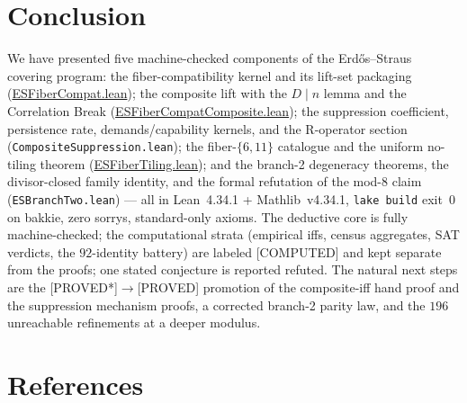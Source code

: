 \documentclass[11pt,a4paper]{article}
\theoremstyle{definition}
\begin{document}
\section{Conclusion}

We have presented five machine-checked components of the Erd\H{o}s--Straus
covering program: the fiber-compatibility kernel and its lift-set
packaging (\url{ESFiberCompat.lean}); the composite lift with the
$D\mid n$ lemma and the Correlation Break
(\url{ESFiberCompatComposite.lean}); the suppression coefficient,
persistence rate, demands/capability kernels, and the R-operator section
(\texttt{CompositeSuppression.lean}); the fiber-$\{6,11\}$ catalogue and
the uniform no-tiling theorem (\url{ESFiberTiling.lean}); and the
branch-2 degeneracy theorems, the divisor-closed family identity, and
the formal refutation of the mod-$8$ claim (\texttt{ESBranchTwo.lean}) ---
all in Lean~4.34.1 + Mathlib~v4.34.1, \texttt{lake build} exit~$0$ on
bakkie, zero sorrys, standard-only axioms. The deductive core is fully
machine-checked; the computational strata (empirical iffs, census
aggregates, SAT verdicts, the $92$-identity battery) are labeled
[COMPUTED] and kept separate from the proofs; one stated conjecture is
reported refuted. The natural next steps are the [PROVED*]$\to$[PROVED]
promotion of the composite-iff hand proof and the suppression mechanism
proofs, a corrected branch-2 parity law, and the $196$ unreachable
refinements at a deeper modulus.

\section{References}
\end{document}
